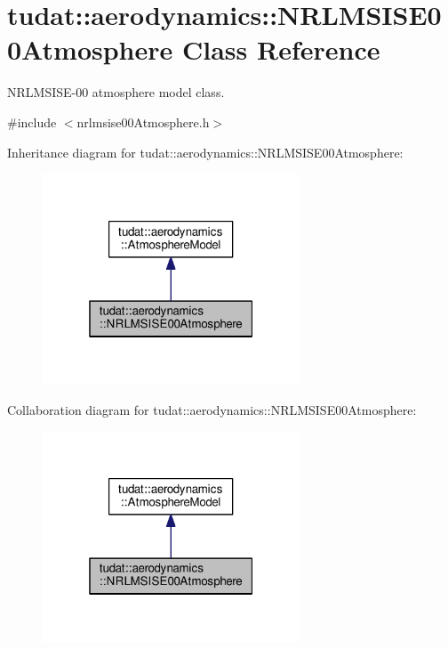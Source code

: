 \hypertarget{classtudat_1_1aerodynamics_1_1NRLMSISE00Atmosphere}{}\section{tudat\+:\+:aerodynamics\+:\+:N\+R\+L\+M\+S\+I\+S\+E00\+Atmosphere Class Reference}
\label{classtudat_1_1aerodynamics_1_1NRLMSISE00Atmosphere}


N\+R\+L\+M\+S\+I\+S\+E-\/00 atmosphere model class.  




{\ttfamily \#include $<$nrlmsise00\+Atmosphere.\+h$>$}



Inheritance diagram for tudat\+:\+:aerodynamics\+:\+:N\+R\+L\+M\+S\+I\+S\+E00\+Atmosphere\+:
\nopagebreak
\begin{figure}[H]
\begin{center}
\leavevmode
\includegraphics[width=217pt]{classtudat_1_1aerodynamics_1_1NRLMSISE00Atmosphere__inherit__graph}
\end{center}
\end{figure}


Collaboration diagram for tudat\+:\+:aerodynamics\+:\+:N\+R\+L\+M\+S\+I\+S\+E00\+Atmosphere\+:
\nopagebreak
\begin{figure}[H]
\begin{center}
\leavevmode
\includegraphics[width=217pt]{classtudat_1_1aerodynamics_1_1NRLMSISE00Atmosphere__coll__graph}
\end{center}
\end{figure}
